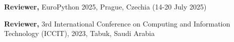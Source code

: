 
\begin{cvlistsection}
\item \textbf{Reviewer,} EuroPython 2025, Prague, Czechia (14-20 July 2025)
\item \textbf{Reviewer,} 3rd International Conference on Computing and Information Technology (ICCIT), 2023, Tabuk, Saudi Arabia
\end{cvlistsection}
